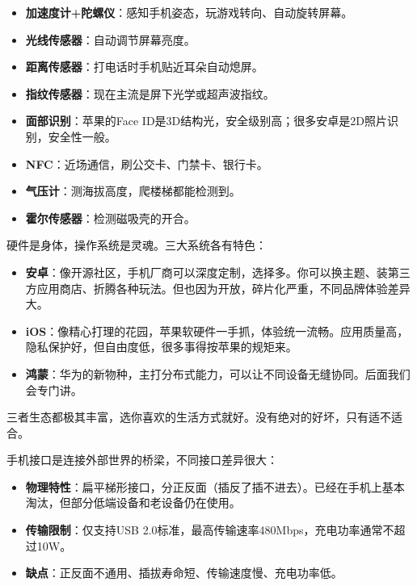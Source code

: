 \begin{itemize}
  \item \textbf{加速度计+陀螺仪}：感知手机姿态，玩游戏转向、自动旋转屏幕。
  \item \textbf{光线传感器}：自动调节屏幕亮度。
  \item \textbf{距离传感器}：打电话时手机贴近耳朵自动熄屏。
  \item \textbf{指纹传感器}：现在主流是屏下光学或超声波指纹。
  \item \textbf{面部识别}：苹果的Face ID是3D结构光，安全级别高；很多安卓是2D照片识别，安全性一般。
  \item \textbf{NFC}：近场通信，刷公交卡、门禁卡、银行卡。
  \item \textbf{气压计}：测海拔高度，爬楼梯都能检测到。
  \item \textbf{霍尔传感器}：检测磁吸壳的开合。
\end{itemize}


硬件是身体，操作系统是灵魂。三大系统各有特色：

\begin{itemize}
  \item \textbf{安卓}：像开源社区，手机厂商可以深度定制，选择多。你可以换主题、装第三方应用商店、折腾各种玩法。但也因为开放，碎片化严重，不同品牌体验差异大。
  \item \textbf{iOS}：像精心打理的花园，苹果软硬件一手抓，体验统一流畅。应用质量高，隐私保护好，但自由度低，很多事得按苹果的规矩来。
  \item \textbf{鸿蒙}：华为的新物种，主打分布式能力，可以让不同设备无缝协同。后面我们会专门讲。
\end{itemize}

三者生态都极其丰富，选你喜欢的生活方式就好。没有绝对的好坏，只有适不适合。


手机接口是连接外部世界的桥梁，不同接口差异很大：


\begin{itemize}
  \item \textbf{物理特性}：扁平梯形接口，分正反面（插反了插不进去）。已经在手机上基本淘汰，但部分低端设备和老设备仍在使用。
  \item \textbf{传输限制}：仅支持USB 2.0标准，最高传输速率480Mbps，充电功率通常不超过10W。
  \item \textbf{缺点}：正反面不通用、插拔寿命短、传输速度慢、充电功率低。
\end{itemize}

